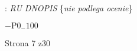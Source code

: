 \documentclass[a4paper,12pt]{article}
\begin{document}
: {\it RU DNOPIS} \{{\it nie podlega ocenie}\}

$-\mathrm{P}0_{-}100$

Strona 7 z30
\end{document}
